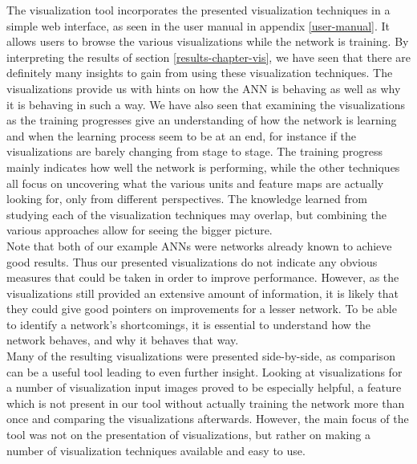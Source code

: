 The visualization tool incorporates the presented visualization techniques in a simple web interface, as seen in the user manual in appendix \ref{user-manual}. It allows users to browse the various visualizations while the network is training. By interpreting the results of section \ref{results-chapter-vis}, we have seen that there are definitely many insights to gain from using these visualization techniques. The visualizations provide us with hints on how the ANN is behaving as well as why it is behaving in such a way. We have also seen that examining the visualizations as the training progresses give an understanding of how the network is learning and when the learning process seem to be at an end, for instance if the visualizations are barely changing from stage to stage. The training progress mainly indicates how well the network is performing, while the other techniques all focus on uncovering what the various units and feature maps are actually looking for, only from different perspectives. The knowledge learned from studying each of the visualization techniques may overlap, but combining the various approaches allow for seeing the bigger picture. \\

\noindent Note that both of our example ANNs were networks already known to achieve good results. Thus our presented visualizations do not indicate any obvious measures that could be taken in order to improve performance. However, as the visualizations still provided an extensive amount of information, it is likely that they could give good pointers on improvements for a lesser network. To be able to identify a network's shortcomings, it is essential to understand how the network behaves, and why it behaves that way. \\

\noindent Many of the resulting visualizations were presented side-by-side, as comparison can be a useful tool leading to even further insight. Looking at visualizations for a number of visualization input images proved to be especially helpful, a feature which is not present in our tool without actually training the network more than once and comparing the visualizations afterwards. However, the main focus of the tool was not on the presentation of visualizations, but rather on making a number of visualization techniques available and easy to use. \\

